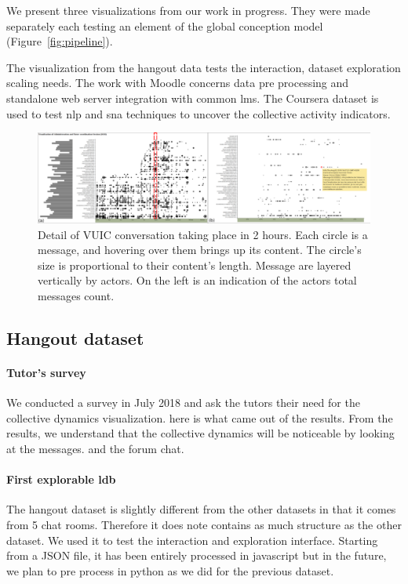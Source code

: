 \documentclass[a4paper,twoside]{article}
\begin{document}
We present three visualizations from our work in progress.  They were made separately each testing an element of the global conception model (Figure~\ref{fig:pipeline}).

The visualization from the hangout data tests the interaction, dataset exploration scaling needs.  The work with Moodle concerns data pre processing and standalone web server integration with common \gls{lms}.  The Coursera dataset is used to test \gls{nlp} and \gls{sna} techniques to uncover the collective activity indicators.

\begin{figure}[t]
  \centering
  \includegraphics[width=\textwidth]{images/uvci_paysage_flou}
  \small{
    \caption{\label{fig:hgconv}
      Detail of VUIC conversation taking place in 2 hours.  Each circle is a message, and hovering over them brings up its content.  The circle's size is proportional to their content's length.  Message are layered vertically by actors.  On the left is an indication of the actors total messages count.
    }}
\end{figure}

\subsection{Hangout dataset}

\paragraph{Tutor's survey}

We conducted a survey in July 2018 and ask the tutors their need for the collective dynamics visualization.  here is what came out of the results.
From the results, we understand that the collective dynamics will be noticeable by looking at the messages. and the forum chat.


\paragraph{First explorable \gls{ldb}}

The hangout dataset is slightly different from the other datasets in that it comes from 5 chat rooms.  Therefore it does note contains as much structure as the other dataset.
We used it to test the interaction and exploration interface.  Starting from a JSON file, it has been entirely processed in javascript but in the future, we plan to pre process in python as we did for the previous dataset.
\end{document}
